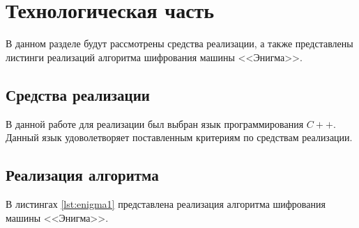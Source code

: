 \chapter{Технологическая часть}

В данном разделе будут рассмотрены средства реализации, а также представлены листинги реализаций алгоритма шифрования машины <<Энигма>>.

\section{Средства реализации}
В данной работе для реализации был выбран язык программирования $C++$. Данный язык удоволетворяет поставленным критериям по средствам реализации.

\section{Реализация алгоритма}

В листингах \ref{lst:enigma1} представлена реализация алгоритма шифрования машины <<Энигма>>.


